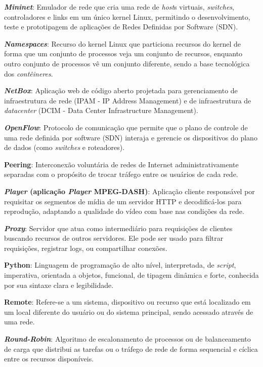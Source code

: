 {\textbf{\textit{Mininet}}: Emulador de rede que cria uma rede de \textit{host}s virtuais, \textit{switches}, controladores e links em um único kernel Linux, permitindo o desenvolvimento, teste e prototipagem de aplicações de Redes Definidas por Software (SDN).

\textbf{\textit{Namespaces}}: Recurso do kernel Linux que particiona recursos do kernel de forma que um conjunto de processos veja um conjunto de recursos, enquanto outro conjunto de processos vê um conjunto diferente, sendo a base tecnológica dos \textit{contêineres}.

\textbf{\textit{NetBox}}: Aplicação web de código aberto projetada para gerenciamento de infraestrutura de rede (IPAM - IP Address Management) e de infraestrutura de \textit{datacenter} (DCIM - Data Center Infrastructure Management).

\textbf{\textit{OpenFlow}}: Protocolo de comunicação que permite que o plano de controle de uma rede definida por software (SDN) interaja e gerencie os dispositivos do plano de dados (como \textit{switches} e roteadores).

\textbf{Peering}: Interconexão voluntária de redes de Internet administrativamente separadas com o propósito de trocar tráfego entre os usuários de cada rede.

\textbf{\textit{Player} (aplicação \textit{Player} MPEG-DASH)}: Aplicação cliente responsável por requisitar os segmentos de mídia de um servidor HTTP e decodificá-los para reprodução, adaptando a qualidade do vídeo com base nas condições da rede.

\textbf{\textit{Proxy}}: Servidor que atua como intermediário para requisições de clientes buscando recursos de outros servidores. Ele pode ser usado para filtrar requisições, registrar logs, ou compartilhar conexões.

\textbf{Python}: Linguagem de programação de alto nível, interpretada, de \textit{script}, imperativa, orientada a objetos, funcional, de tipagem dinâmica e forte, conhecida por sua sintaxe clara e legibilidade.

\textbf{Remote}: Refere-se a um sistema, dispositivo ou recurso que está localizado em um local diferente do usuário ou do sistema principal, sendo acessado através de uma rede.

\textbf{\textit{Round-Robin}}: Algoritmo de escalonamento de processos ou de balanceamento de carga que distribui as tarefas ou o tráfego de rede de forma sequencial e cíclica entre os recursos disponíveis.

}
